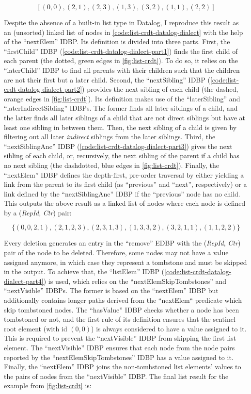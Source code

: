 \[[ (0,0), (2,1), (2,3), (1,3), (3,2), (1,1), (2,2) ]\]

Despite the absence of a built-in list type in Datalog, I reproduce this result
as an (unsorted) linked list of nodes in \ref{code:list-crdt-datalog-dialect}
with the help of the ``nextElem'' \ac{IDBP}.
Its definition is divided into three parts.
First, the ``firstChild'' \ac{IDBP} (\ref{code:list-crdt-datalog-dialect-part1})
finds the first child of each parent
(the dotted, green edges in \ref{fig:list-crdt}).
To do so, it relies on the ``laterChild'' \ac{IDBP} to find all parents with
their children such that the children are not their first but a later child.
Second, the ``nextSibling'' \ac{IDBP} (\ref{code:list-crdt-datalog-dialect-part2})
provides the next sibling of each child
(the dashed, orange edges in \ref{fig:list-crdt}).
Its definition makes use of the ``laterSibling'' and ``laterIndirectSibling''
\acp{IDBP}. The former finds all later siblings of a child, and the latter
finds all later siblings of a child that are not direct siblings but have
at least one sibling in between them.
Then, the next sibling of a child is given by filtering out all later
\emph{indirect} siblings from the later siblings.
Third, the ``nextSiblingAnc'' \ac{IDBP} (\ref{code:list-crdt-datalog-dialect-part3})
gives the next sibling of each child, or, recursively,
the next sibling of the parent if a child has no next sibling
(the dashdotted, blue edges in \ref{fig:list-crdt}).
Finally, the ``nextElem'' \ac{IDBP} defines the depth-first, pre-order traversal
by either yielding a link from the parent to its first child (as ``previous''
and ``next'', respectively) or a link defined by the ``nextSiblingAnc'' \ac{IDBP}
if the ``previous'' node has no child.
This outputs the above result as a linked list of nodes where each node is
defined by a (\textit{RepId}, \textit{Ctr}) pair:

\[\{ (0,0,2,1), (2,1,2,3), (2,3,1,3), (1,3,3,2), (3,2,1,1), (1,1,2,2) \}\]

Every deletion generates an entry in the ``remove'' \ac{EDBP} with the
(\textit{RepId}, \textit{Ctr}) pair of the node to be deleted.
Therefore, some nodes may not have a value assigned anymore, in which case
they represent a tombstone and must be skipped in the output.
To achieve that, the ``listElem'' \ac{IDBP}
(\ref{code:list-crdt-datalog-dialect-part4}) is used, which relies on
the ``nextElemSkipTombstones'' and ``nextVisible'' \acp{IDBP}.
The former is based on the ``nextElem'' \ac{IDBP} but additionally contains
longer paths derived from the ``nextElem`` predicate which skip tombstoned nodes.
The ``hasValue'' \ac{IDBP} checks whether a node has been tombstoned or not,
and the first rule of its definition ensures that the sentinel root element
(with id \((0, 0)\)) is always considered to have a value assigned to it.
This is required to prevent the ``nextVisible'' \ac{IDBP} from skipping the
first list element.
The ``nextVisible'' \ac{IDBP} ensures that each node from the node pairs
reported by the  ``nextElemSkipTombstones'' \ac{IDBP} has a value assigned to it.
Finally, the ``nextElem'' \ac{IDBP} joins the non-tombstoned list elements'
values to the pairs of nodes from the ``nextVisible'' \ac{IDBP}.
The final list result for the example from \ref{fig:list-crdt} is:

